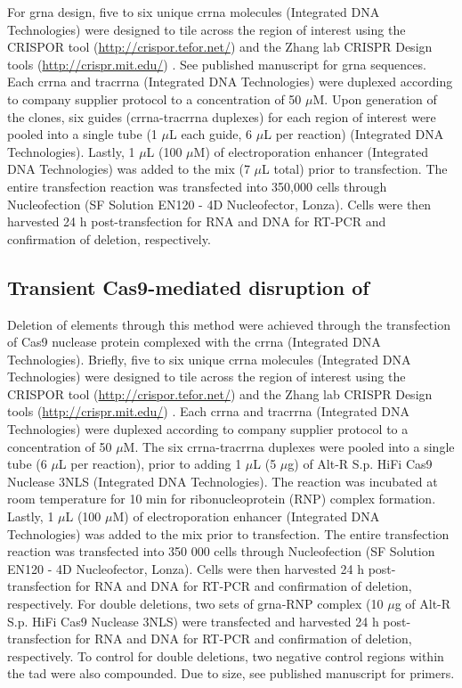 For \gls{grna} design, five to six unique \gls{crrna} molecules (Integrated DNA Technologies) were designed to tile across the region of interest using the CRISPOR tool (\url{http://crispor.tefor.net/}) \cite{haeusslerEvaluationOfftargetOntarget2016} and the Zhang lab CRISPR Design tools (\url{http://crispr.mit.edu/}) \cite{hsuDNATargetingSpecificity2013}.
See published manuscript for \gls{grna} sequences.
Each \gls{crrna} and \gls{tracrrna} (Integrated DNA Technologies) were duplexed according to company supplier protocol to a concentration of 50 $\mu$M.
Upon generation of the clones, six guides (\gls{crrna}-\gls{tracrrna} duplexes) for each region of interest were pooled into a single tube (1 $\mu$L each guide, 6 $\mu$L per reaction) (Integrated DNA Technologies).
Lastly, 1 $\mu$L (100 $\mu$M) of electroporation enhancer (Integrated DNA Technologies) was added to the mix (7 $\mu$L total) prior to transfection.
The entire transfection reaction was transfected into 350,000 cells through Nucleofection (SF Solution EN120 - 4D Nucleofector, Lonza).
Cells were then harvested 24 h post-transfection for RNA and DNA for RT-PCR and confirmation of deletion, respectively.

\subsection{Transient Cas9-mediated disruption of }

Deletion of elements through this method were achieved through the transfection of Cas9 nuclease protein complexed with the \gls{crrna} (Integrated DNA Technologies).
Briefly, five to six unique \gls{crrna} molecules (Integrated DNA Technologies) were designed to tile across the region of interest using the CRISPOR tool (\url{http://crispor.tefor.net/}) \cite{haeusslerEvaluationOfftargetOntarget2016} and the Zhang lab CRISPR Design tools (\url{http://crispr.mit.edu/}) \cite{hsuDNATargetingSpecificity2013}.
Each \gls{crrna} and \gls{tracrrna} (Integrated DNA Technologies) were duplexed according to company supplier protocol to a concentration of 50 $\mu$M.
The six \gls{crrna}-\gls{tracrrna} duplexes were pooled into a single tube (6 $\mu$L per reaction), prior to adding 1 $\mu$L (5 $\mu$g) of Alt-R S.p. HiFi Cas9 Nuclease 3NLS (Integrated DNA Technologies).
The reaction was incubated at room temperature for 10 min for ribonucleoprotein (RNP) complex formation.
Lastly, 1 $\mu$L (100 $\mu$M) of electroporation enhancer (Integrated DNA Technologies) was added to the mix prior to transfection.
The entire transfection reaction was transfected into 350 000 cells through Nucleofection (SF Solution EN120 - 4D Nucleofector, Lonza).
Cells were then harvested 24 h post-transfection for RNA and DNA for RT-PCR and confirmation of deletion, respectively.
For double deletions, two sets of \gls{grna}-RNP complex (10 $\mu$g of Alt-R S.p. HiFi Cas9 Nuclease 3NLS) were transfected and harvested 24 h post-transfection for RNA and DNA for RT-PCR and confirmation of deletion, respectively.
To control for double deletions, two negative control regions within the \gls{tad} were also compounded.
Due to size, see published manuscript for primers.

